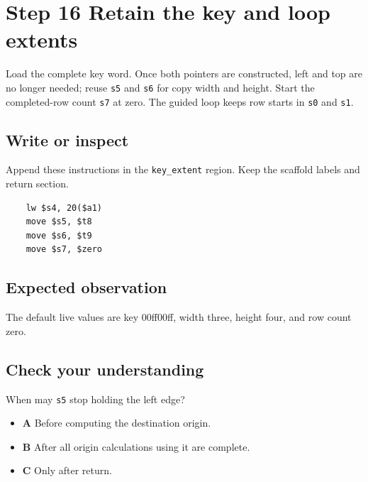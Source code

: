 \section{Step 16 Retain the key and loop extents}\label{blit-s16}

Load the complete key word. Once both pointers are constructed, left and top are no longer needed; reuse \texttt{s5} and \texttt{s6} for copy width and height. Start the completed-row count \texttt{s7} at zero. The guided loop keeps row starts in \texttt{s0} and \texttt{s1}.

\subsection{Write or inspect}
Append these instructions in the \texttt{key\_extent} region. Keep the scaffold labels and return section.

\begin{verbatim}
    lw $s4, 20($a1)
    move $s5, $t8
    move $s6, $t9
    move $s7, $zero
\end{verbatim}

\subsection{Expected observation}
The default live values are key 00ff00ff, width three, height four, and row count zero.

\subsection{Check your understanding}
When may \texttt{s5} stop holding the left edge?

\begin{itemize}
  \item \textbf{A} Before computing the destination origin.
  \item \textbf{B} After all origin calculations using it are complete.
  \item \textbf{C} Only after return.
\end{itemize}
